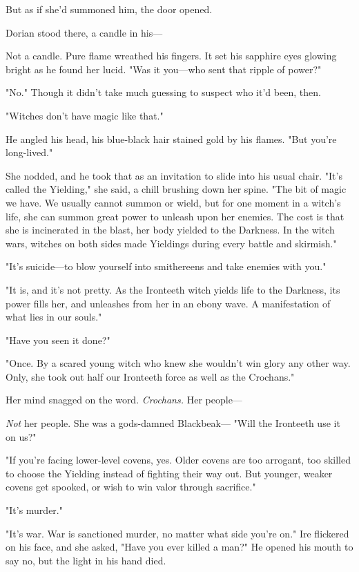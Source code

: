 But as if she'd summoned him, the door opened.

Dorian stood there, a candle in his---

Not a candle. Pure flame wreathed his fingers. It set his sapphire eyes glowing bright as he found her lucid. "Was it you---who sent that ripple of power?"

"No." Though it didn't take much guessing to suspect who it'd been, then.

"Witches don't have magic like that."

He angled his head, his blue-black hair stained gold by his flames. "But you're long-lived."

She nodded, and he took that as an invitation to slide into his usual chair. "It's called the Yielding," she said, a chill brushing down her spine. "The bit of magic we have. We usually cannot summon or wield, but for one moment in a witch's life, she can summon great power to unleash upon her enemies. The cost is that she is incinerated in the blast, her body yielded to the Darkness. In the witch wars, witches on both sides made Yieldings during every battle and skirmish."

"It's suicide---to blow yourself into smithereens  and take enemies with you."

"It is, and it's not pretty. As the Ironteeth witch yields life to the Darkness, its power fills her, and unleashes from her in an ebony wave. A manifestation of what lies in our souls."

"Have you seen it done?"

"Once. By a scared young witch who knew she wouldn't win glory any other way. Only, she took out half our Ironteeth force as well as the Crochans."

Her mind snagged on the word. \emph{Crochans.} Her people---

\emph{Not} her people. She was a gods-damned Blackbeak--- "Will the Ironteeth use it on us?"

"If you're facing lower-level covens, yes. Older covens are too arrogant, too skilled to choose the Yielding instead of fighting their way out. But younger, weaker covens get spooked, or wish to win valor through sacrifice."

"It's murder."

"It's war. War is sanctioned murder, no matter what side you're on." Ire flickered on his face, and she asked, "Have you ever killed a man?" He opened his mouth to say no, but the light in his hand died.


